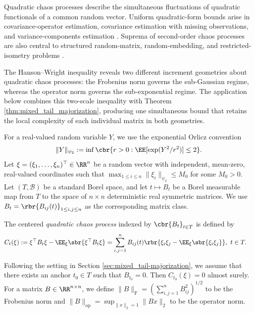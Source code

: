 \documentclass[11pt]{article}
\begin{document}
Quadratic chaos processes describe the simultaneous fluctuations of
quadratic functionals of a common random vector. Uniform quadratic-form
bounds arise in covariance-operator estimation, covariance estimation
with missing observations, and variance-components estimation
\citep{adamczak2015note,klochkov2020uniform,dicker2017flexible}.
Suprema of second-order chaos processes are also central to structured
random-matrix, random-embedding, and restricted-isometry problems
\citep{krahmer2014suprema,dirksen2015tail}.

The Hanson--Wright inequality reveals two different increment geometries about quadratic chaos processes: the Frobenius norm governs the sub-Gaussian regime, whereas
the operator norm governs the sub-exponential regime. The application
below combines this two-scale inequality with Theorem
\ref{thm:mixed_tail_majorization}, producing one simultaneous bound
that retains the local complexity of each individual matrix in both
geometries.

For a real-valued random variable $Y$, we use the exponential Orlicz
convention
\begin{align*}
\|Y\|_{\psi_2}
:=
\inf\cbr{
r>0:
\EE[\exp(Y^2/r^2)]\le2
}.
\end{align*}
Let $\xi=(\xi_1,\ldots,\xi_n)^\top\in\RR^n$ be a random vector with
independent, mean-zero, real-valued coordinates such that
$\max_{1\le i\le n}\|\xi_i\|_{\psi_2}\le M_0$ for some $M_0>0$. Let $(T,\mathcal B)$ be a standard Borel space, and let $t\mapsto B_t$ be a Borel measurable map from $T$ to the space of
$n\times n$ deterministic real symmetric matrices. We use $B_t=\rbr{B_{ij}(t)}_{1\le i,j\le n}$ as the corresponding matrix class.
\begin{definition}
\label{def:quadratic_chaos_process}
The centered \emph{quadratic chaos process} indexed by
$\cbr{B_t}_{t\in T}$ is defined by
\begin{align*}
C_t(\xi)
&:=
\xi^\top B_t\xi
-\EE_\xi\sbr{\xi^\top B_t\xi}=
\sum_{i,j=1}^n
B_{ij}(t)
\rbr{
\xi_i\xi_j-\EE_\xi\sbr{\xi_i\xi_j}
},
\ t\in T.
\end{align*}
\end{definition}
Following the setting in Section \ref{sec:mixed_tail-majorization}, we assume that there exists an anchor $t_0\in T$ such that
$B_{t_0}=0$. Then $C_{t_0}(\xi)=0$ almost surely. For a matrix $B\in\RR^{n\times n}$, we define $\|B\|_{\mathrm F}=(\sum_{i,j=1}^n B_{ij}^2
)^{1/2}$ to be the Frobenius norm and $\|B\|_{\mathrm{op}}=\sup_{\|x\|_2=1}\|Bx\|_2$ to be the operator norm.
\end{document}
